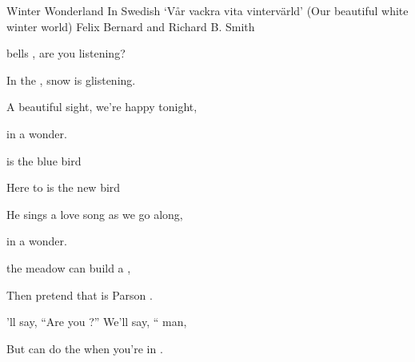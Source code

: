 \begin{SBSong}{Winter Wonderland}
    {In Swedish `V\aa r vackra vita vinterv\"arld' (Our beautiful white winter world)}
    {Felix Bernard and Richard B. Smith }
  \begin{SBVerse}
     bells , are you listening?
    
    In the , snow is glistening.
    
    A beautiful sight, we're happy tonight,
    
     in a  wonder.
  \end{SBVerse}
  \begin{SBVerse}
      is the blue bird
    
    Here to  is the new bird
    
    He sings a love song as we go along,
    
     in a  wonder.
  \end{SBVerse}
  \begin{SBVerse}
     the meadow  can build a ,
    
    Then pretend that  is Parson .
    
    'll say, ``Are you  ?'' We'll say, `` man,
    
    But  can do the  when you're in .
  \end{SBVerse}
  

\end{SBSong}
